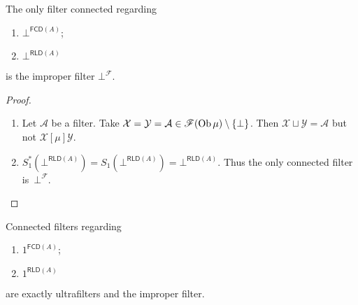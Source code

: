 \begin{prop}
  The only filter connected regarding
  \begin{enumerate}
    \item $\bot^{\mathsf{FCD} (A)}$;
    \item $\bot^{\mathsf{RLD} (A)}$
  \end{enumerate}
  is the improper filter $\bot^{\mathscr{F}}$.
\end{prop}

\begin{proof}
  ~
  \begin{enumerate}
    \item Let $\mathcal{A}$ be a filter. Take $\mathcal{X} = \mathcal{Y} =
    \mathcal{A} \in \mathscr{F} (\operatorname{Ob} \mu) \setminus \{ \bot \}$. Then
    $\mathcal{X} \sqcup \mathcal{Y} = \mathcal{A}$ but not $\mathcal{X}
    \mathrel{[\mu]} \mathcal{Y}$.

    \item $S^{\ast}_1 (\bot^{\mathsf{RLD} (A)}) = S_1
    (\bot^{\mathsf{RLD} (A)}) = \bot^{\mathsf{RLD} (A)}$. Thus
    the only connected filter is~$\bot^{\mathscr{F}}$.
  \end{enumerate}
\end{proof}

\begin{prop}
  Connected filters regarding
  \begin{enumerate}
    \item $1^{\mathsf{FCD} (A)}$;

    \item $1^{\mathsf{RLD} (A)}$
  \end{enumerate}
  are exactly ultrafilters and the improper filter.
\end{prop}

